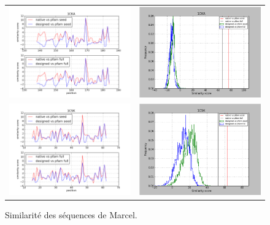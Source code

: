 \documentclass[a4paper,12pt]{article}
\begin{document}
   \begin{figure}[t]
     \centering
     \begin{tabular}{cc}
       \includegraphics[width=8.45cm]{marcel_seq/1CKA/graph_simil_bypos.png} &
       \includegraphics[width=8.45cm]{marcel_seq/1CKA/graph_simil_byseq.png} \\
       \includegraphics[width=8.45cm]{marcel_seq/1CSK/graph_simil_bypos.png} &
       \includegraphics[width=8.45cm]{marcel_seq/1CSK/graph_simil_byseq.png} \\

     \end{tabular}

     \caption{Similarité des séquences de Marcel.}

   \end{figure}
\end{document}
